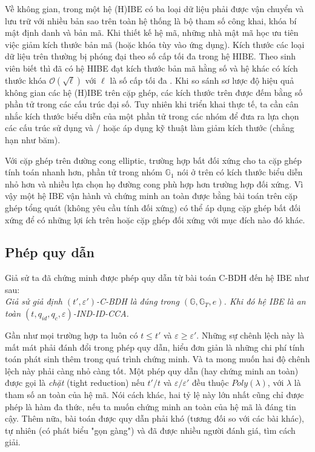 \documentclass[class=report, crop=false]{standalone}
\begin{document}
			Về không gian, trong một hệ (H)IBE có ba loại dữ liệu phải được vận chuyển và lưu trữ với nhiều bản sao trên toàn hệ thống là bộ tham số công khai, khóa bí mật định danh và bản mã. Khi thiết kế hệ mã, những nhà mật mã học ưu tiên việc giảm kích thước bản mã (hoặc khóa tùy vào ứng dụng). Kích thước các loại dữ liệu trên thường bị phóng đại theo số cấp tối đa trong hệ HIBE. Theo sinh viên biết thì đã có hệ HIBE đạt kích thước bản mã hằng số và hệ khác có kích thước khóa $\mathcal{O}(\sqrt{\ell})$ với $\ell$ là số cấp tối đa \cite{DBLP:conf/eurocrypt/BonehBG05}. Khi so sánh sơ lược độ hiệu quả không gian các hệ (H)IBE trên cặp ghép, các kích thước trên được đếm bằng số phần tử trong các cấu trúc đại số. Tuy nhiên khi triển khai thực tế, ta cần cân nhắc kích thước biểu diễn của một phần tử trong các nhóm để đưa ra lựa chọn các cấu trúc sử dụng và / hoặc áp dụng kỹ thuật làm giảm kích thước (chẳng hạn như băm).

			Với cặp ghép trên đường cong elliptic, trường hợp bất đối xứng cho ta cặp ghép tính toán nhanh hơn, phần tử trong nhóm $\mathbb{G}_1$ nói ở trên có kích thước biểu diễn nhỏ hơn và nhiều lựa chọn họ đường cong phù hợp hơn trường hợp đối xứng. Vì vậy một hệ IBE vận hành và chứng minh an toàn được bằng bài toán trên cặp ghép tổng quát (không yêu cầu tính đối xứng) có thể áp dụng cặp ghép bất đối xứng để có những lợi ích trên hoặc cặp ghép đối xứng với mục đích nào đó khác.
		\subsection{Phép quy dẫn}
			Giả sử ta đã chứng minh được phép quy dẫn từ bài toán C-BDH đến hệ IBE \scheme như sau: \\ \indent
			\textit{
			Giả sử giả định $(t', \varepsilon')$-C-BDH là đúng trong $(\mathbb{G}, \mathbb{G}_T, e)$. Khi đó hệ IBE \scheme là an toàn $(t, q_{id}, q_c, \varepsilon)$-IND-ID-CCA.}
			
			Gần như mọi trường hợp ta luôn có $t \leq t'$ và $\varepsilon \geq \varepsilon'$. Những sự chênh lệch này là mất mát phải đánh đổi trong phép quy dẫn, hiểu đơn giản là những chi phí tính toán phát sinh thêm trong quá trình chứng minh. Và ta mong muốn hai độ chênh lệch này phải càng nhỏ càng tốt. Một phép quy dẫn (hay chứng minh an toàn) được gọi là \textit{chặt} (tight reduction) nếu $t'/t$ và $\varepsilon/\varepsilon'$ đều thuộc $Poly(\lambda)$, với $\lambda$ là tham số an toàn của hệ mã. Nói cách khác, hai tỷ lệ này lớn nhất cũng chỉ được phép là hàm đa thức, nếu ta muốn chứng minh an toàn của hệ mã là đáng tin cậy. Thêm nữa, bài toán được quy dẫn phải khó (tương đối so với các bài khác), tự nhiên (có phát biểu "gọn gàng") và đã được nhiều người đánh giá, tìm cách giải.
\end{document}
